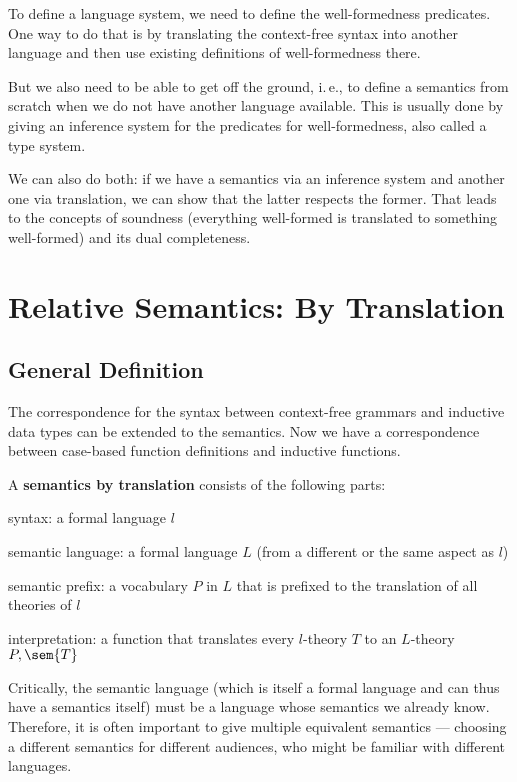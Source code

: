 To define a language system, we need to define the well-formedness predicates.
One way to do that is by translating the context-free syntax into another language and then use existing definitions of well-formedness there.

But we also need to be able to get off the ground, i.\,e., to define a semantics from scratch when we do not have another language available.
This is usually done by giving an inference system for the predicates for well-formedness, also called a type system.

We can also do both: if we have a semantics via an inference system and another one via translation, we can show that the latter respects the former.
That leads to the concepts of soundness (everything well-formed is translated to something well-formed) and its dual completeness.

\section{Relative Semantics: By Translation}

\subsection{General Definition}

The correspondence for the syntax between context-free grammars and inductive data types can be extended to the semantics.
Now we have a correspondence between case-based function definitions and inductive functions.

\begin{definition}
A \textbf{semantics by translation} consists of the following parts:
\begin{compactitem}
 \item syntax: a formal language $l$
 \item semantic language: a formal language $L$ (from a different or the same aspect as $l$)
 \item semantic prefix: a vocabulary $P$ in $L$ that is prefixed to the translation of all theories of $l$
 \item interpretation: a function that translates every $l$-theory $T$ to an $L$-theory $P,\sem{T}$
\end{compactitem}
\end{definition}

Critically, the semantic language (which is itself a formal language and can thus have a semantics itself) must be a language whose semantics we already know.
Therefore, it is often important to give multiple equivalent semantics --- choosing a different semantics for different audiences, who might be familiar with different languages.

